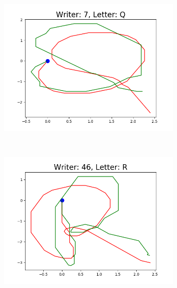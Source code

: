 \begin{figure}
\begin{subfigure}[b]{0.17\textwidth}
          \includegraphics[width=\textwidth]{images/framework/comparison_figures/Q_7.png}
      \end{subfigure}
      ~
      \begin{subfigure}[b]{0.17\textwidth}
          \includegraphics[width=\textwidth]{images/framework/comparison_figures/R_46.png}
      \end{subfigure}
      ~
      \begin{subfigure}[b]{0.17\textwidth}

\end{subfigure}
\end{figure}
